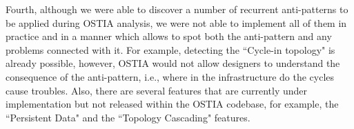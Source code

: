 Fourth, although we were able to discover a number of recurrent anti-patterns to be applied during OSTIA analysis, we were not able to implement all of them in practice and in a manner which allows to spot both the anti-pattern and any problems connected with it. For example, detecting the ``Cycle-in topology" is already possible, however, OSTIA would not allow designers to understand the consequence of the anti-pattern, i.e., where in the infrastructure do the cycles cause troubles. Also, there are several features that are currently under implementation but not released within the OSTIA codebase, for example, the ``Persistent Data" and the ``Topology Cascading" features.
%


